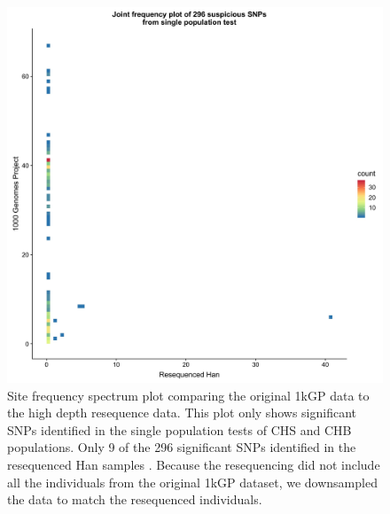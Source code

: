 \documentclass[9pt,lineno]{elife}
\begin{document}
\begin{figure}[h]
\centering
\includegraphics[width=12cm,keepaspectratio]{./Figures/Han_1kGP_SFS_singlePop.jpg}
\caption{Site frequency spectrum plot comparing the original 1kGP data to the high depth resequence data. This plot only shows significant SNPs identified in the single population tests of CHS and CHB populations. Only 9 of the 296 significant SNPs identified in the resequenced Han samples \citep{Lan2017}.
Because the resequencing did not include all the individuals from the original 1kGP dataset, we downsampled the data to match the resequenced individuals.}  
\label{90HanSFS}
\end{figure}
\end{document}
